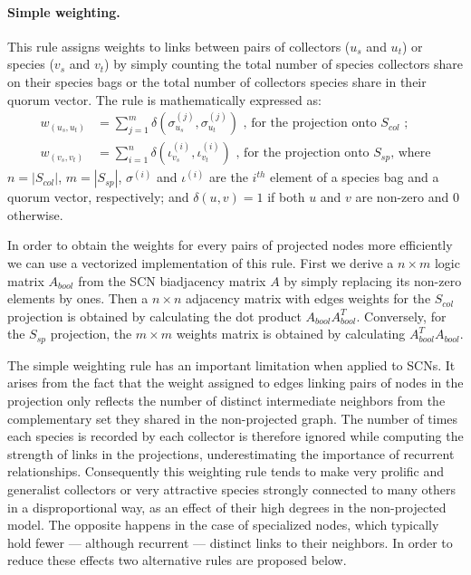 {\paragraph*{Simple weighting.}
This rule assigns weights to links between pairs of collectors ($u_s$ and $u_t$) or species ($v_s$ and $v_t$) by simply counting the total number of species collectors share on their species bags or the total number of collectors species share in their quorum vector. The rule is mathematically expressed as:
\begin{equation} \label{eq:simple_weighting}
\begin{split}
w_{(u_s, u_t)} &= \sum_{j=1}^{m} \delta(\sigma^{(j)}_{u_s}, \sigma^{(j)}_{u_t})\mbox{ , for the projection onto }S_{col}\mbox{ ;}\\
w_{(v_s, v_t)} &= \sum_{i=1}^{n} \delta(\iota^{(i)}_{v_s}, \iota^{(i)}_{v_t})
\mbox{ , for the projection onto }S_{sp}\mbox{, where}
\end{split}
\end{equation}
$n = |S_{col}|$, $m = |S_{sp}|$, $\sigma^{(i)}$ and $\iota^{(i)}$ are the $i^{th}$ element of a species bag and a quorum vector, respectively; and $\delta(u,v)=1$ if both $u$ and $v$ are non-zero and $0$ otherwise.

In order to obtain the weights for every pairs of projected nodes more efficiently we can use a vectorized implementation of this rule. First we derive a $n\times m$ logic matrix $A_{bool}$ from the SCN biadjacency matrix $A$ by simply replacing its non-zero elements by ones. 
Then a $n \times n$ adjacency matrix with edges weights for the $S_{col}$ projection is obtained by calculating the dot product $A_{bool} A_{bool}^T$.
Conversely, for the $S_{sp}$ projection, the $m \times m$ weights matrix is obtained by calculating $A_{bool}^T A_{bool}$.

The simple weighting rule has an important limitation when applied to SCNs.
It arises from the fact that the weight assigned to edges linking pairs of nodes in the projection only reflects the number of distinct intermediate neighbors from the complementary set they shared in the non-projected graph. The number of times each species is recorded by each collector is therefore ignored while computing the strength of links in the projections, underestimating the importance of recurrent relationships.
Consequently this weighting rule tends to make very prolific and generalist collectors or very attractive species strongly connected to many others in a disproportional way, as an effect of their high degrees in the non-projected model. The opposite happens in the case of specialized nodes, which typically hold fewer --- although recurrent --- distinct links to their neighbors. 
In order to reduce these effects two alternative rules are proposed below.

}
